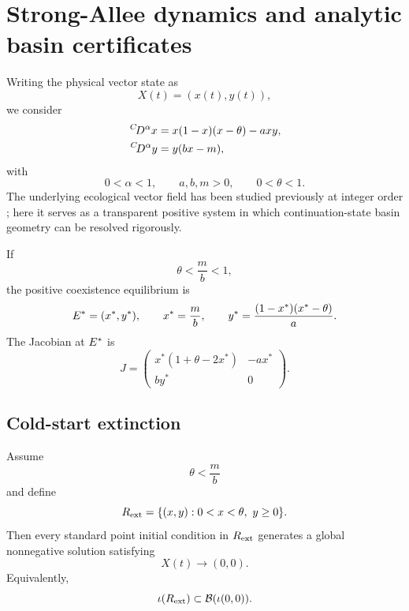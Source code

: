 \section{Strong-Allee dynamics and analytic basin certificates}
\label{sec:model}

Writing the physical vector state as
\[
  X(t)=(x(t),y(t)),
\]
we consider
\begin{subequations}
\label{eq:model}
\begin{align}
  \,{}^{C}\!D^{\alpha} x
  &=
  x(1-x)(x-\theta)-axy,
  \label{eq:model-x}\\
  \,{}^{C}\!D^{\alpha} y
  &=
  y(bx-m),
  \label{eq:model-y}
\end{align}
\end{subequations}
with
\[
  0<\alpha<1,
  \qquad
  a,b,m>0,
  \qquad
  0<\theta<1.
\]
The underlying ecological vector field has been studied previously at integer order
\cite{YeEtAl2019StrongAlleePredatorPrey}; here it serves as a transparent positive system in which continuation-state basin geometry can be resolved rigorously.

If
\[
  \theta<\frac{m}{b}<1,
\]
the positive coexistence equilibrium is
\begin{equation}
  E^{*}=(x^*,y^*),
  \qquad
  x^*=\frac{m}{b},
  \qquad
  y^*=\frac{(1-x^*)(x^*-\theta)}{a}.
  \label{eq:coexistence-equilibrium}
\end{equation}
The Jacobian at \(E^{*}\) is
\begin{equation}
  J=
  \begin{pmatrix}
    x^*(1+\theta-2x^*) & -ax^*\\
    by^* & 0
  \end{pmatrix}.
  \label{eq:coexistence-jacobian}
\end{equation}

\subsection{Cold-start extinction}

\begin{theorem}
\label{thm:extinction-strip}
Assume
\[
  \theta<\frac{m}{b}
\]
and define
\begin{equation}
  R_{\mathrm{ext}}
  =
  \{(x,y):0<x<\theta,\ y\ge0\}.
  \label{eq:extinction-strip}
\end{equation}
Then every standard point initial condition in \(R_{\mathrm{ext}}\) generates a global nonnegative solution satisfying
\[
  X(t)\to(0,0).
\]
Equivalently,
\[
  \iota(R_{\mathrm{ext}})\subset\mathcal{B}(\iota(0,0)).
\]
\end{theorem}

